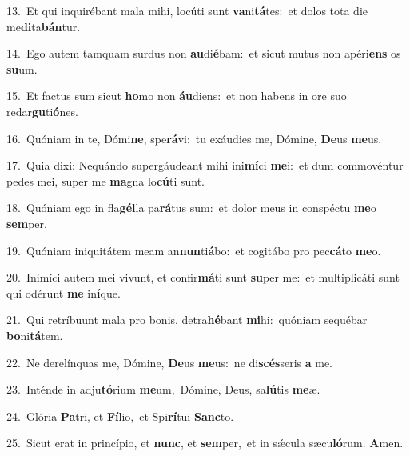 {\numbfont\textcolor{\numbcolor}{13.}}~Et qui inquirébant mala mihi, locúti sunt \textbf{va}\-ni\-\textbf{tá}\-tes:~\star et dolos tota die me\-\textbf{di}\-ta\-\textbf{bán}\-tur.\par
{\numbfont\textcolor{\numbcolor}{14.}}~Ego autem tamquam surdus non \textbf{au}\-di\-\textbf{é}\-bam:~\star et sicut mutus non apéri\textbf{ens} os \textbf{su}\-um.\par
{\numbfont\textcolor{\numbcolor}{15.}}~Et factus sum sicut \textbf{ho}\-mo non \textbf{áu}\-diens:~\star et non habens in ore suo redar\-\textbf{gu}\-ti\-\textbf{ó}\-nes.\par
{\numbfont\textcolor{\numbcolor}{16.}}~Quóniam in te, Dómi\-\textbf{ne}\-, spe\-\textbf{rá}\-vi:~\star tu exáudies me, Dómine, \textbf{De}\-us \textbf{me}\-us.\par
{\numbfont\textcolor{\numbcolor}{17.}}~Quia dixi: Nequándo supergáudeant mihi ini\-\textbf{mí}\-ci \textbf{me}\-i:~\star et dum commovéntur pedes mei, super me \textbf{ma}\-gna lo\-\textbf{cú}\-ti sunt.\par
{\numbfont\textcolor{\numbcolor}{18.}}~Quóniam ego in fla\-\textbf{gél}\-la pa\-\textbf{rá}\-tus sum:~\star et dolor meus in conspéctu \textbf{me}\-o \textbf{sem}\-per.\par
{\numbfont\textcolor{\numbcolor}{19.}}~Quóniam iniquitátem meam an\-\textbf{nun}\-ti\-\textbf{á}\-bo:~\star et cogitábo pro pec\-\textbf{cá}\-to \textbf{me}\-o.\par
{\numbfont\textcolor{\numbcolor}{20.}}~Inimíci autem mei vivunt, et confir\-\textbf{má}\-ti sunt \textbf{su}\-per me:~\star et multiplicáti sunt qui odérunt \textbf{me} in\-\textbf{í}\-que.\par
{\numbfont\textcolor{\numbcolor}{21.}}~Qui retríbuunt mala pro bonis, detra\-\textbf{hé}\-bant \textbf{mi}\-hi:~\star quóniam sequébar \textbf{bo}\-ni\-\textbf{tá}\-tem.\par
{\numbfont\textcolor{\numbcolor}{22.}}~Ne derelínquas me, Dómine, \textbf{De}\-us \textbf{me}\-us:~\star ne di\-\textbf{scés}\-seris \textbf{a} me.\par
{\numbfont\textcolor{\numbcolor}{23.}}~Inténde in adju\-\textbf{tó}\-rium \textbf{me}\-um,~\star Dómine, Deus, sa\-\textbf{lú}\-tis \textbf{me}\-æ.\par
{\numbfont\textcolor{\numbcolor}{24.}}~Glória \textbf{Pa}\-tri, et \textbf{Fí}\-lio,~\star et Spi\-\textbf{rí}\-tui \textbf{Sanc}\-to.\par
{\numbfont\textcolor{\numbcolor}{25.}}~Sicut erat in princípio, et \textbf{nunc}\-, et \textbf{sem}\-per,~\star et in sǽcula sæcu\-\textbf{ló}\-rum. \textbf{A}\-men.\par
